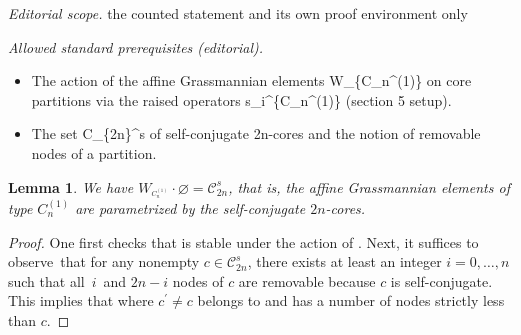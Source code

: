 \documentclass[10pt,a4paper]{article}
\newtheorem{Lemma}[Theorem]{Lemma}
\numberwithin{equation}{section}
\begin{document}
\noindent\textit{Editorial scope.} the counted statement and its own proof environment only\par\medskip
\noindent\textit{Allowed standard prerequisites (editorial).}\begin{itemize}
\item The action of the affine Grassmannian elements W\_\{C\_n\textasciicircum{}(1)\} on core partitions via the raised operators s\_i\textasciicircum{}\{C\_n\textasciicircum{}(1)\} (section 5 setup).
\item The set C\_\{2n\}\textasciicircum{}s of self-conjugate 2n-cores and the notion of removable nodes of a partition.
\end{itemize}\medskip
\begin{Lemma}
	\label{Lemma_selfconjugate}We have $W_{^{C_{n}^{(1)}}}\cdot \varnothing =
	\mathcal{C}_{2n}^{s}$, that is, the affine Grassmannian elements of type $
	C_{n}^{(1)}$ are parametrized by the self-conjugate $2n$-cores.
\end{Lemma}

\begin{proof}
	One first checks that  is stable under the action of .
    Next, it suffices to ob\-serve~that for any nonempty $%
	c\in \mathcal{C}_{2n}^{s}$, there exists at least an integer $i=0,\dots ,n$
	such that all~$i$~and $2n-i$ nodes of $c$ are removable because $c$
	is self-conjugate. This implies that 
    where $c^{\prime }\neq c$ belongs to  and has a
	number of nodes strictly less than $c$.
\end{proof}
\end{document}
